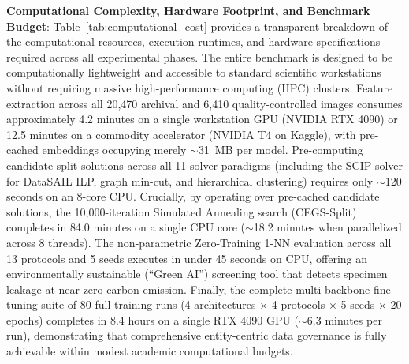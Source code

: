 \documentclass[a4paper,fleqn]{cas-sc}
\begin{document}
\textbf{Computational Complexity, Hardware Footprint, and Benchmark Budget}: Table~\ref{tab:computational_cost} provides a transparent breakdown of the computational resources, execution runtimes, and hardware specifications required across all experimental phases. The entire benchmark is designed to be computationally lightweight and accessible to standard scientific workstations without requiring massive high-performance computing (HPC) clusters. Feature extraction across all 20,470 archival and 6,410 quality-controlled images consumes approximately 4.2 minutes on a single workstation GPU (NVIDIA RTX 4090) or 12.5 minutes on a commodity accelerator (NVIDIA T4 on Kaggle), with pre-cached embeddings occupying merely $\sim$31~MB per model. Pre-computing candidate split solutions across all 11 solver paradigms (including the SCIP solver for DataSAIL ILP, graph min-cut, and hierarchical clustering) requires only $\sim$120 seconds on an 8-core CPU. Crucially, by operating over pre-cached candidate solutions, the 10,000-iteration Simulated Annealing search (CEGS-Split) completes in 84.0 minutes on a single CPU core ($\sim$18.2 minutes when parallelized across 8 threads). The non-parametric Zero-Training 1-NN evaluation across all 13 protocols and 5 seeds executes in under 45 seconds on CPU, offering an environmentally sustainable (``Green AI'') screening tool that detects specimen leakage at near-zero carbon emission. Finally, the complete multi-backbone fine-tuning suite of 80 full training runs (4 architectures $\times$ 4 protocols $\times$ 5 seeds $\times$ 20 epochs) completes in 8.4 hours on a single RTX 4090 GPU ($\sim$6.3 minutes per run), demonstrating that comprehensive entity-centric data governance is fully achievable within modest academic computational budgets.
\end{document}
